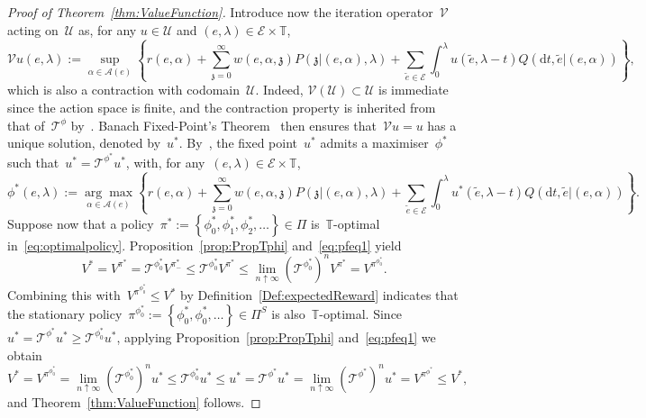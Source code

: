 \documentclass{amsart}[11pt]
\numberwithin{equation}{section}
\theoremstyle{definition}
\newcommand{\D}{\mathrm{d}}
\newcommand{\Ee}{\mathcal{E}}
\newcommand{\Tt}{\mathcal{T}}
\newcommand{\Vv}{\mathcal{V}}
\newcommand{\TT}{\mathbb{T}}
\newcommand{\zz}{\mathfrak{z}}
\newcommand{\Uu}{\mathcal{U}}
\newcommand{\Aa}{\mathcal{A}}
\begin{document}
\begin{proof}[Proof of Theorem~\ref{thm:ValueFunction}]
Introduce now the iteration operator~$\Vv$ acting on~$\Uu$ as, 
for any $u\in\Uu$ and $(e, \lambda)\in \Ee\times \TT$,
\begin{equation}\label{eq:DPoA}
\Vv u(e,\lambda) := \sup_{\alpha\in\Aa(e)}\left\{
r(e,\alpha) + \sum_{\zz = 0}^\infty w(e, \alpha, \zz)P(\zz\lvert (e, \alpha), \lambda)
+\sum_{\tilde{e}\in \Ee}\int_0^\lambda u(\tilde{e}, \lambda - t)Q(\D t, \tilde{e}\lvert (e, \alpha))
\right\},
\end{equation}
which is also a contraction with codomain~$\Uu$. 
Indeed, $\Vv(\Uu)\subset\Uu$ is immediate since the action space is finite,
and the contraction property is inherited from that of~$\Tt^\phi$ 
by~\cite[Theorem 2]{denardo1967contraction}.
Banach Fixed-Point's Theorem~\cite{granas2013fixed} then ensures that~$\Vv u = u$ has a unique solution, denoted by~$u^*$.
By~\cite[Section 1]{Mamer1986successive}, 
the fixed point~$u^*$ admits a maximiser~$\phi^*$ such that~$u^* = \Tt^{\phi^*}u^*$, 
with, for any~$(e, \lambda)\in\Ee\times\TT$,
\begin{equation}\label{eq:Toptimalp}
\phi^*(e, \lambda) := \underset{\alpha\in\Aa(e)}{\arg\max}
\left\{
r(e,\alpha) + \sum_{\zz = 0}^\infty w(e, \alpha, \zz)P(\zz\lvert (e, \alpha), \lambda)
+\sum_{\tilde{e}\in \Ee}\int_0^\lambda u^*(\tilde{e}, \lambda - t)Q(\D t, \tilde{e}\lvert (e, \alpha))
\right\}.
\end{equation}
Suppose now that a policy~$\pi^*:= \left\{\phi^*_0, \phi^*_1, \phi^*_2, \dots\right\}\in\Pi$ is~$\TT$-optimal in~\eqref{eq:optimalpolicy}.
Proposition~\ref{prop:PropTphi} and~\eqref{eq:pfeq1} yield
\begin{equation}\label{eq:pfeq2}
V^* = V^{\pi^*} = \Tt^{\phi^*_0}V^{\pi^*_-} \leq \Tt^{\phi^*_0} V^{\pi^*}\leq\lim_{n\uparrow\infty}\left(\Tt^{\phi^*_0}\right)^nV^{\pi^*} = V^{\pi^{\phi^*_0}}.
\end{equation}
Combining this with~$V^{\pi^{\phi^*_0}}\leq V^*$ by Definition~\ref{Def:expectedReward} indicates that
the stationary policy~$\pi^{\phi^*_0} := \left\{\phi^*_0, \phi^*_0, \dots\right\}\in\Pi^S$ is also~$\TT$-optimal.
Since~$u^* = \Tt^{\phi^*}u^*\geq \Tt^{\phi^*_0}u^*$, 
applying Proposition~\ref{prop:PropTphi} and~\eqref{eq:pfeq1} we obtain
$$
V^* = V^{\pi^{\phi^*_0}}=\lim_{n\uparrow\infty}\left(\Tt^{\phi^*_0}\right)^nu^*\leq\Tt^{\phi^*_0}u^*\leq u^* = \Tt^{\phi^*}u^*  =\lim_{n\uparrow\infty} \left(\Tt^{\phi^*}\right)^n u^* = V^{\pi^{\phi^*}}\leq V^*,
$$
and Theorem~\ref{thm:ValueFunction} follows. 
\end{proof}
\end{document}
